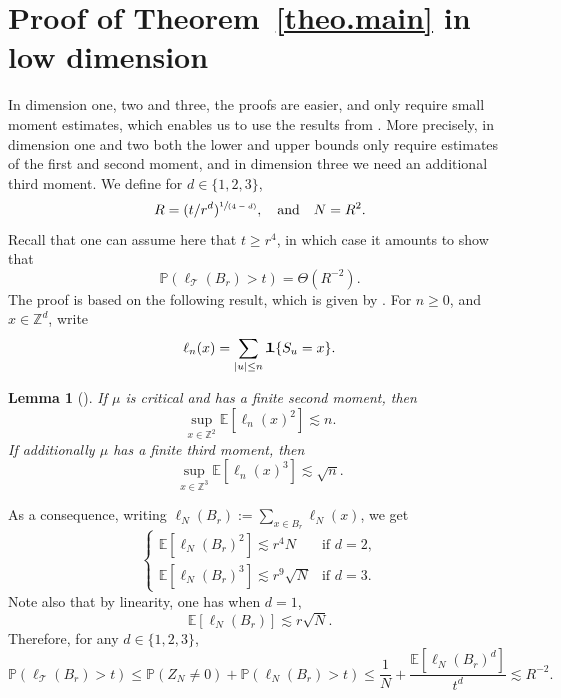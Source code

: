 \documentclass[JEP,XML,SOM,Unicode,NoFloatCountersInSection,published]{cedram}
\newcommand{\spfrac}[2]{\sfrac{#1}{(#2)}}
\theoremstyle{plain}
\newtheorem{lemma}[theorem]{Lemma}
\theoremstyle{definition}
\newcommand\T{\mathcal{T}}
\newcommand{\1}{{\text{\Large $\mathfrak 1$}}}
\begin{document}
\section{Proof of Theorem~\ref{theo.main} in low dimension}\label{sec-LD}
In dimension one, two and three, the proofs are easier, and only
require small moment estimates,
which enables us to use the results from \cite{AHJ}.
More precisely, in dimension one and two both the lower and upper bounds only require estimates of the
first and second moment,
and in dimension three we need an additional third moment. We define for $d\in \{1,2,3\}$,
\begin{equation*}
R = (t/r^d)^{\spfrac{1}{4-d}}, \quad \text{and}\quad N= R^2.
\end{equation*}
Recall that one can assume here that $t\ge r^4$, in which case it amounts to show that
\[
\mathbb P(\ell_\T(B_r) > t) = \Theta (R^{-2}).
\]
The proof is based on the following result, which is given by \cite[Lem.\,4.3]{AHJ}. For $n\ge 0$, and $x\in \mathbb Z^d$, write
\[
\ell_n(x) = \sum_{|u|\le n} \1\{S_u= x\}.
\]
\begin{lemma}[\cite{AHJ}] \label{lem.AHJ}
If $\mu$ is critical and has a finite second moment, then
\begin{equation*}
\sup_{x\in \mathbb Z^2} \mathbb E[\ell_n(x)^2] \lesssim n.
\end{equation*}
If additionally $\mu$ has a finite third moment, then
\[
\sup_{x\in \mathbb Z^3} \mathbb E[\ell_n(x)^3]\lesssim \sqrt n.
\]
\end{lemma}
As a consequence, writing $\ell_N(B_r):= \sum_{x\in B_r} \ell_N(x)$, we get
\[
\begin{cases}
\mathbb E[\ell_N(B_r)^2] \lesssim
r^4 N & \text{if }d=2, \\[5pt]
\mathbb E[\ell_N(B_r)^3]\lesssim r^9 \sqrt{N} & \text{if }d=3.
\end{cases}
\]
Note also that by linearity, one has when $d=1$,
\[
\mathbb E[\ell_N(B_r)] \lesssim r \sqrt N.
\]
Therefore, for any $d\in \{1,2,3\}$,
\[
\mathbb P(\ell_\T(B_r) >t ) \le \mathbb P(Z_N \neq 0) + \mathbb P(\ell_N(B_r) >t )\le \frac 1N + \frac { \mathbb E[\ell_N(B_r)^d]}{t^d}\lesssim R^{-2}.
\]
\end{document}
